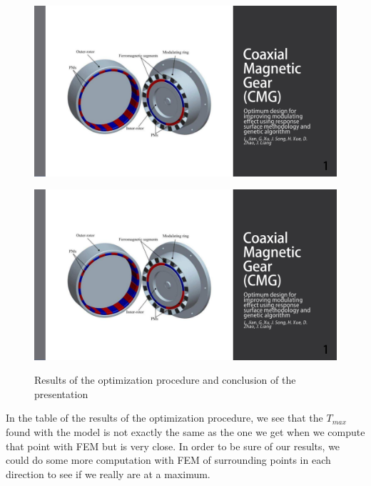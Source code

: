 \begin{figure}[H]
    \begin{minipage}{.48\linewidth}
    \centering
        \includegraphics[page={62},width=\textwidth]{LELEC2311.allow.pdf}
    \end{minipage}
    \hfill%
    \begin{minipage}[c]{.48\linewidth}
        \centering
        \includegraphics[page={63},width=\textwidth]{LELEC2311.allow.pdf}
        \label{fig:63_th slide}
    \end{minipage}
    \caption{Results of the optimization procedure and conclusion of the presentation}
\end{figure}

In the table of the results of the optimization procedure, we see that the $T_{max}$ found with the model is not exactly the same as the one we get when we compute that point with FEM but is very close. In order to be sure of our results, we could do some more computation with FEM of surrounding points in each direction to see if we really are at a maximum.
